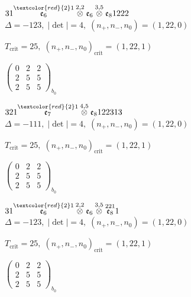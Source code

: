 \documentclass[10pt]{article}
\begin{document}
\smallskip

$31\overset{\textcolor{red}{2}1}{\mathfrak{e}_6}\overset{2,2}{\otimes}\mathfrak{e}_6\overset{3,5}{\otimes}\mathfrak{e}_81222$ \quad $\Delta=-123,\; |\det|=4,\; (n_+,n_-,n_0)=(1,22,0)$

\hspace{1em}$T_{\text{crit}}=25,\; (n_+,n_-,n_0)_{\text{crit}}=(1,22,1)$

\hspace{2em}$\left(\begin{smallmatrix}0 & 2 & 2 \\ 2 & 5 & 5 \\ 2 & 5 & 5\end{smallmatrix}\right)_{\!b_0}$

\smallskip

$321\overset{\textcolor{red}{2}1}{\mathfrak{e}_7}\overset{4,5}{\otimes}\mathfrak{e}_8122313$ \quad $\Delta=-111,\; |\det|=4,\; (n_+,n_-,n_0)=(1,22,0)$

\hspace{1em}$T_{\text{crit}}=25,\; (n_+,n_-,n_0)_{\text{crit}}=(1,22,1)$

\hspace{2em}$\left(\begin{smallmatrix}0 & 2 & 2 \\ 2 & 5 & 5 \\ 2 & 5 & 5\end{smallmatrix}\right)_{\!b_0}$

\smallskip

$31\overset{\textcolor{red}{2}1}{\mathfrak{e}_6}\overset{2,2}{\otimes}\mathfrak{e}_6\overset{3,5}{\otimes}\overset{221}{\mathfrak{e}_8}1$ \quad $\Delta=-123,\; |\det|=4,\; (n_+,n_-,n_0)=(1,22,0)$

\hspace{1em}$T_{\text{crit}}=25,\; (n_+,n_-,n_0)_{\text{crit}}=(1,22,1)$

\hspace{2em}$\left(\begin{smallmatrix}0 & 2 & 2 \\ 2 & 5 & 5 \\ 2 & 5 & 5\end{smallmatrix}\right)_{\!b_0}$
\end{document}
